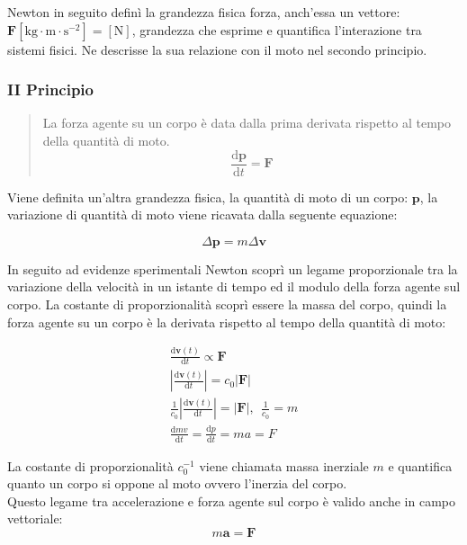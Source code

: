 \documentclass{article}
\newcommand{\vect}[1]{\boldsymbol{\mathbf{#1}}}
\newcommand{\df}{\mathrm{d}}
\numberwithin{equation}{subsection}
\begin{document}
Newton in seguito definì la grandezza fisica forza, anch'essa un 
vettore: $\vect{F}\left[\mathrm{kg}\cdot \mathrm{m}\cdot{\mathrm{s}^{-2}}\right]=\left[\mathrm{N}\right]$, grandezza che esprime e quantifica l'interazione tra sistemi fisici. Ne descrisse 
la sua relazione con il moto nel secondo principio.

\subsubsection{II Principio}
\begin{quotation}
    La forza agente su un corpo è data dalla prima derivata 
    rispetto al tempo della quantità di moto. 
    \begin{equation}
        \displaystyle\frac{\df\vect{p}}{\df t}=\vect{F}
    \end{equation}
\end{quotation}
Viene definita un'altra grandezza fisica, la quantità di moto 
di un corpo: $\vect{p}$, la variazione di quantità di moto 
viene ricavata dalla seguente equazione:

\begin{equation}
    \Delta\vect{p}=m\Delta\vect{v}
\end{equation}

In seguito ad evidenze sperimentali Newton scoprì un legame 
proporzionale tra la variazione della velocità in un istante di tempo 
ed il modulo della forza agente sul corpo. La costante di proporzionalità 
scoprì essere la massa del corpo, quindi la forza agente 
su un corpo è la derivata rispetto al tempo della quantità di 
moto:

\begin{gather*}
    \displaystyle\frac{\df\vect{v}(t)}{\df t}\propto\vect{F}\\
    \left|\displaystyle\frac{\df\vect{v}(t)}{\df t}\right|=c_0\left|\vect{F}\right|\\
    \frac{1}{c_0} \left|\displaystyle\frac{\df\vect{v}(t)}{\df t}\right|=\left|\vect{F}\right|{,}\:\:\frac{1}{c_0}=m\\
    \displaystyle\frac{\df mv}{\df t}=\frac{\df p}{\df t}=ma=F
\end{gather*}

La costante di proporzionalità $c_0^{-1}$ viene chiamata massa 
inerziale $m$ e quantifica quanto un corpo si oppone al moto ovvero l'inerzia 
del corpo.
\\
Questo legame tra accelerazione e forza agente sul corpo è valido 
anche in campo vettoriale: 
\begin{equation}
    m\vect{a}=\vect{F}
\end{equation}
\end{document}
